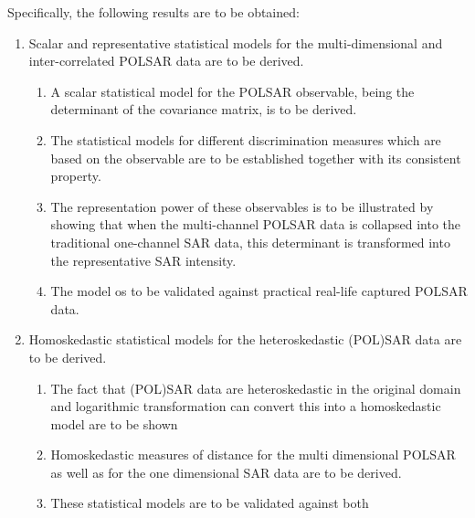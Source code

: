 Specifically, the following results are to be obtained:
\begin{enumerate}
\item                Scalar and representative statistical models
                for the multi-dimensional and inter-correlated POLSAR
                data are to be derived.
                \begin{enumerate}
                \item \label{itm:polsar_model} A scalar statistical model for the
                POLSAR observable, being the determinant of the
                covariance matrix, is to be derived.
                \item \label{itm:polsar_discrimination_measure} The statistical models for different discrimination measures which are based on
                the observable are to be established together with its consistent property. %
                \item \label{itm:polsar_include_sar} The representation power of these observables is to be illustrated by showing
                that when the multi-channel POLSAR data is collapsed
                into the traditional one-channel SAR data, this
                determinant is transformed into the representative SAR
                intensity.
                \item \label{itm:polsar_validation} The model os to be validated against practical real-life
                captured POLSAR data.
                \end{enumerate}
\item                Homoskedastic statistical models for the
                heteroskedastic (POL)SAR data are to be derived. 
                \begin{enumerate}
                \item \label{itm:log_transform} The fact that (POL)SAR data are heteroskedastic in
                the original domain and logarithmic transformation
                can convert this into a homoskedastic model are to be shown
                \item \label{itm:sar_measures_distance} Homoskedastic measures of distance for
                the multi dimensional POLSAR as well as for the one
                dimensional SAR data are to be derived.
                \item \label{itm:sar_validation} These statistical models are to be validated against both

\end{enumerate}
\end{enumerate}
